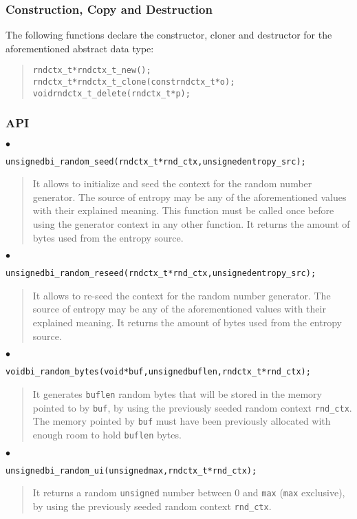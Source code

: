 \documentclass[a4paper]{article}
\newenvironment{code}%
{\begin{quote}\footnotesize\begin{alltt}}%
{\end{alltt}\end{quote}}%
\newenvironment{api}%
{\noindent$\bullet$\hfill\begin{minipage}[t]{0.97\linewidth}\footnotesize\begin{alltt}}%
{\end{alltt}\end{minipage}}%
\begin{document}
\subsubsection*{Construction, Copy and Destruction}
The following functions declare the constructor, cloner and destructor
for the aforementioned abstract data type:
\begin{code}
rndctx_t* rndctx_t_new();
rndctx_t* rndctx_t_clone(const rndctx_t* o);
void rndctx_t_delete(rndctx_t* p);
\end{code}
\subsubsection*{API}
\begin{api}
unsigned bi_random_seed(rndctx_t* rnd_ctx, unsigned entropy_src);
\end{api}
\begin{quote}\footnotesize
It allows to initialize and seed the context for the random number
generator. The source of entropy may be any of the aforementioned
values with their explained meaning. This function must be called once
before using the generator context in any other function. It returns
the amount of bytes used from the entropy source.
\end{quote}
\begin{api}
unsigned bi_random_reseed(rndctx_t* rnd_ctx, unsigned entropy_src);
\end{api}
\begin{quote}\footnotesize
It allows to re-seed the context for the random number
generator. The source of entropy may be any of the aforementioned
values with their explained meaning. It returns
the amount of bytes used from the entropy source.
\end{quote}
\begin{api}
void bi_random_bytes(void* buf, unsigned buflen, rndctx_t* rnd_ctx);
\end{api}
\begin{quote}\footnotesize
It generates \verb|buflen| random bytes that will be stored in the
memory pointed to by \verb|buf|, by using the previously seeded random
context \verb|rnd_ctx|. The memory pointed by \verb|buf| must have
been previously allocated with enough room to hold \verb|buflen| bytes.
\end{quote}
\begin{api}
unsigned bi_random_ui(unsigned max, rndctx_t* rnd_ctx);
\end{api}
\begin{quote}\footnotesize
It returns a random \verb|unsigned| number between 0 and \verb|max|
(\verb|max| exclusive), by using the previously seeded random context
\verb|rnd_ctx|.
\end{quote}
\end{document}
